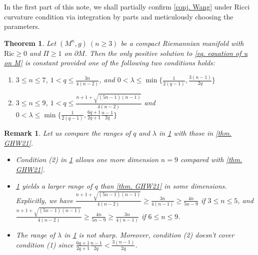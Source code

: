\documentclass[12pt]{amsart}
\newtheorem{theorem}{Theorem}
\newtheorem{remark}{Remark}
\numberwithin{equation}{section}
\numberwithin{lemma}{section}
\numberwithin{proposition}{section}
\numberwithin{corollary}{section}
\numberwithin{remark}{section}
\begin{document}
In the first part of this note, we shall partially confirm \cref{conj. Wang} under Ricci curvature condition via integration by parts and meticulously choosing the parameters.
\begin{theorem}\label{thm. C. Ricci}
    Let $(M^n,g)\ (n\geq 3)$ be a compact Riemannian manifold with $\mathrm{Ric}\geq 0$ and $\Pi\geq 1$ on $\partial M$. Then the only positive solution to \cref{eq. equation of u on M} is constant provided one of the following two conditions holds:
    \begin{enumerate}
        \item $3\leq n\leq 7$, $1<q\leq \frac{3n}{4(n-2)}$, and $0<\lambda\leq \min\{\frac{1}{2(q-1)}, \frac{3(n-1)}{2q}\}$\\
        \item $3\leq n\leq 9$, $1<q\leq \frac{n+1+\sqrt{(5n-1)(n-1)}}{4(n-2)}$
        and $0<\lambda\leq \min\{\frac{1}{2(q-1)},\frac{6q+1}{2q+1}\frac{n-1}{2q}\}$
    \end{enumerate}
\end{theorem}
\begin{remark}
    Let us compare the ranges of $q$ and $\lambda$ in \cref{thm. C. Ricci} with those in \cref{thm. GHW21}.
    \begin{itemize}
    \item Condition (2) in \cref{thm. C. Ricci} allows one more dimension $n=9$ compared with \cref{thm. GHW21}.
        \item \cref{thm. C. Ricci} yields a larger range of $q$ than \cref{thm. GHW21} in some dimensions. Explicitly, we have   $\frac{n+1+\sqrt{(5n-1)(n-1)}}{4(n-2)}\geq \frac{3n}{4(n-1)}\geq \frac{4n}{5n-9}$ if  $3\leq n\leq 5$, and $\frac{n+1+\sqrt{(5n-1)(n-1)}}{4(n-2)}
        \geq \frac{4n}{5n-9}
        \geq \frac{3n}{4(n-1)}$ if $6\leq n\leq 9$.
        \item The range of $\lambda$ in \cref{thm. C. Ricci} is not sharp. Moreover, condition (2) doesn't cover condition (1) since $\frac{6q+1}{2q+1}\frac{n-1}{2 q}<\frac{3(n-1)}{2q}$.
    \end{itemize}
\end{remark}
\vspace{1em}
\end{document}
